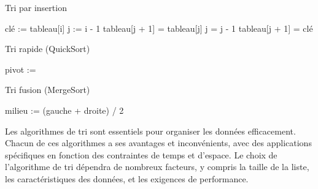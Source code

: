 \begin{algorithm}
	\caption{Tri par insertion}
	\begin{algorithmic}[1]
		\State clé := tableau[i]
		\State j := i - 1
		\State tableau[j + 1] = tableau[j]
		\State j = j - 1
		\EndWhile
		\State tableau[j + 1] = clé
		\EndFor
	\end{algorithmic}
\end{algorithm}

\begin{algorithm}
	\caption{Tri rapide (QuickSort)}
	\begin{algorithmic}[1]
		\State pivot := 
		\State {}
		\State {}
		\EndIf
		\EndFunction
	\end{algorithmic}
\end{algorithm}

\begin{algorithm}
	\caption{Tri fusion (MergeSort)}
	\begin{algorithmic}[1]
		\State milieu := (gauche + droite) / 2
		\State {}
		\State {}
		\State {}
		\EndIf
		\EndFunction
	\end{algorithmic}
\end{algorithm}


		Les algorithmes de tri sont essentiels pour organiser les données efficacement. Chacun de ces algorithmes a ses avantages et inconvénients, avec des applications spécifiques en fonction des contraintes de temps et d'espace. Le choix de l'algorithme de tri dépendra de nombreux facteurs, y compris la taille de la liste, les caractéristiques des données, et les exigences de performance. 
		
